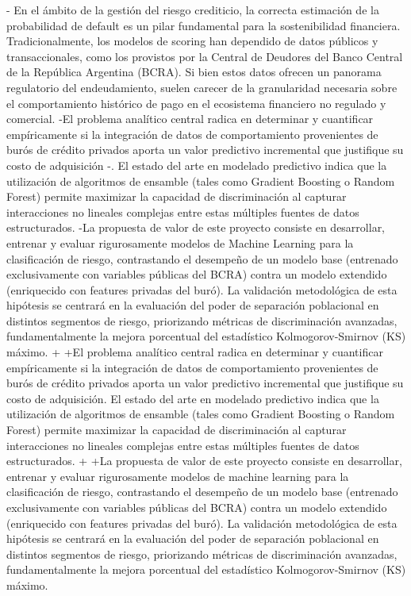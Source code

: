 \documentclass[
 11pt, %
-%
+codirector, %
 ]{charter}
\begin{document}
\begin{table}[ht]
-%
 En el ámbito de la gestión del riesgo crediticio, la correcta estimación de la probabilidad de default es un pilar fundamental para la sostenibilidad financiera. Tradicionalmente, los modelos de scoring han dependido de datos públicos y transaccionales, como los provistos por la Central de Deudores del Banco Central de la República Argentina (BCRA). Si bien estos datos ofrecen un panorama regulatorio del endeudamiento, suelen carecer de la granularidad necesaria sobre el comportamiento histórico de pago en el ecosistema financiero no regulado y comercial.
-El problema analítico central radica en determinar y cuantificar empíricamente si la integración de datos de comportamiento provenientes de burós de crédito privados aporta un valor predictivo incremental que justifique su costo de adquisición
-. El estado del arte en modelado predictivo indica que la utilización de algoritmos de ensamble (tales como Gradient Boosting o Random Forest) permite maximizar la capacidad de discriminación al capturar interacciones no lineales complejas entre estas múltiples fuentes de datos estructurados.
-La propuesta de valor de este proyecto consiste en desarrollar, entrenar y evaluar rigurosamente modelos de Machine Learning para la clasificación de riesgo, contrastando el desempeño de un modelo base (entrenado exclusivamente con variables públicas del BCRA) contra un modelo extendido (enriquecido con features privadas del buró). La validación metodológica de esta hipótesis se centrará en la evaluación del poder de separación poblacional en distintos segmentos de riesgo, priorizando métricas de discriminación avanzadas, fundamentalmente la mejora porcentual del estadístico Kolmogorov-Smirnov (KS) máximo.
+
+El problema analítico central radica en determinar y cuantificar empíricamente si la integración de datos de comportamiento provenientes de burós de crédito privados aporta un valor predictivo incremental que justifique su costo de adquisición. El estado del arte en modelado predictivo indica que la utilización de algoritmos de ensamble (tales como Gradient Boosting o Random Forest) permite maximizar la capacidad de discriminación al capturar interacciones no lineales complejas entre estas múltiples fuentes de datos estructurados.
+
+La propuesta de valor de este proyecto consiste en desarrollar, entrenar y evaluar rigurosamente modelos de machine learning para la clasificación de riesgo, contrastando el desempeño de un modelo base (entrenado exclusivamente con variables públicas del BCRA) contra un modelo extendido (enriquecido con features privadas del buró). La validación metodológica de esta hipótesis se centrará en la evaluación del poder de separación poblacional en distintos segmentos de riesgo, priorizando métricas de discriminación avanzadas, fundamentalmente la mejora porcentual del estadístico Kolmogorov-Smirnov (KS) máximo.
 

\end{table}
\end{document}
